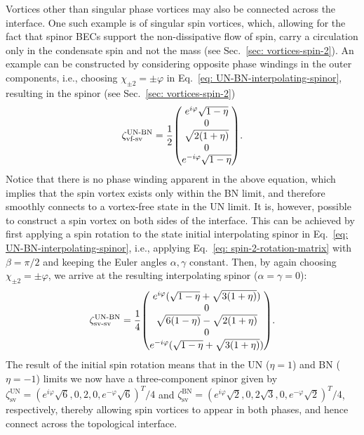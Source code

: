 Vortices other than singular phase vortices may also be connected across the
interface.
One such example is of singular spin vortices, which, allowing for the fact that
spinor BECs support the non-dissipative flow of spin, carry a circulation only
in the condensate spin and not the mass (see Sec.~\ref{sec: vortices-spin-2}).
An example can be constructed by considering opposite phase windings in the
outer components, i.e., choosing \(\chi_{\pm 2} = \pm \varphi \) in
Eq.~\eqref{eq: UN-BN-interpolating-spinor}, resulting in the spinor
(see Sec.~\ref{sec: vortices-spin-2})
\begin{align}\label{eq: UN-BN-SV-SV-spinor}
    \zeta_\text{vf-sv}^\text{UN-BN} = \frac{1}{2}\mqty(
        e^{i\varphi}\sqrt{1 - \eta} \\
        0 \\
        \sqrt{2(1+\eta)} \\
        0 \\
        e^{-i\varphi}\sqrt{1 - \eta}
    ).
\end{align}
Notice that there is no phase winding apparent in the above equation, which
implies that the spin vortex exists only within the BN limit, and therefore
smoothly connects to a vortex-free state in the UN limit.
It is, however, possible to construct a spin vortex on both sides of the
interface.
This can be achieved by first applying a spin rotation to the state initial
interpolating spinor in Eq.~\eqref{eq: UN-BN-interpolating-spinor}, i.e.,
applying Eq.~\eqref{eq: spin-2-rotation-matrix} with \(\beta = \pi/2\) and
keeping the Euler angles \(\alpha, \gamma \) constant.
Then, by again choosing \(\chi_{\pm 2} = \pm \varphi \), we arrive at the
resulting interpolating spinor (\(\alpha = \gamma = 0\)):
\begin{align}
    \zeta_\text{sv-sv}^\text{UN-BN} = \frac{1}{4}\mqty(
        e^{i\varphi}(\sqrt{1 - \eta} + \sqrt{3(1+\eta)}) \\
        0 \\
        \sqrt{6(1-\eta)} - \sqrt{2(1+\eta)} \\
        0 \\
        e^{-i\varphi}(\sqrt{1 - \eta} + \sqrt{3(1+\eta)})
    ).
\end{align}
The result of the initial spin rotation means that in the UN (\(\eta = 1\)) and
BN (\(\eta = -1\)) limits we now have a three-component spinor given by
\(\zeta^\text{UN}_\text{sv} = {(e^{i\varphi}\sqrt{6}, 0, 2, 0,
e^{-\varphi}\sqrt{6})}^T/4\) and
\(\zeta^\text{BN}_\text{sv} = {(e^{i\varphi}\sqrt{2}, 0, 2\sqrt{3}, 0,
e^{-\varphi}\sqrt{2})}^T/4\), respectively, thereby allowing spin vortices to
appear in both phases, and hence connect across the topological interface.

